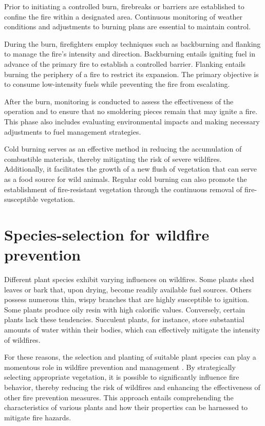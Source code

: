 \documentclass[
  12 pt,
]{Nemilov}
\begin{document}
Prior to initiating a controlled burn, firebreaks or barriers are established to confine the fire within a designated area. Continuous monitoring of weather conditions and adjustments to burning plans are essential to maintain control.

During the burn, firefighters employ techniques such as backburning and flanking to manage the fire's intensity and direction. Backburning entails igniting fuel in advance of the primary fire to establish a controlled barrier. Flanking entails burning the periphery of a fire to restrict its expansion. The primary objective is to consume low-intensity fuels while preventing the fire from escalating.

After the burn, monitoring is conducted to assess the effectiveness of the operation and to ensure that no smoldering pieces remain that may ignite a fire. This phase also includes evaluating environmental impacts and making necessary adjustments to fuel management strategies.

Cold burning serves as an effective method in reducing the accumulation of combustible materials, thereby mitigating the risk of severe wildfires. Additionally, it facilitates the growth of a new flush of vegetation that can serve as a food source for wild animals. Regular cold burning can also promote the establishment of fire-resistant vegetation through the continuous removal of fire-susceptible vegetation.

\section{Species-selection for wildfire prevention}\label{species-selection-for-wildfire-prevention}

Different plant species exhibit varying influences on wildfires. Some plants shed leaves or bark that, upon drying, become readily available fuel sources. Others possess numerous thin, wispy branches that are highly susceptible to ignition. Some plants produce oily resin with high calorific values. Conversely, certain plants lack these tendencies. Succulent plants, for instance, store substantial amounts of water within their bodies, which can effectively mitigate the intensity of wildfires.

For these reasons, the selection and planting of suitable plant species can play a momentous role in wildfire prevention and management \citep{bond2012fire}. By strategically selecting appropriate vegetation, it is possible to significantly influence fire behavior, thereby reducing the risk of wildfires and enhancing the effectiveness of other fire prevention measures. This approach entails comprehending the characteristics of various plants and how their properties can be harnessed to mitigate fire hazards.
\end{document}
